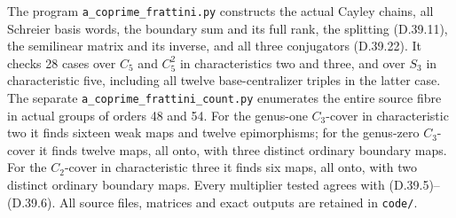 The program \texttt{a\_coprime\_frattini.py} constructs
the actual Cayley chains, all Schreier basis words,
the boundary sum and its full rank, the splitting
\textup{(D.39.11)}, the semilinear matrix and its
inverse, and all three conjugators
\textup{(D.39.22)}.
It checks 28 cases over \(C_5\) and \(C_5^2\)
in characteristics two and three, and over \(S_3\)
in characteristic five, including all twelve
base-centralizer triples in the latter case.
The separate
\texttt{a\_coprime\_frattini\_count.py}
enumerates the entire source fibre in actual
groups of orders 48 and 54.
For the genus-one \(C_3\)-cover in characteristic
two it finds sixteen weak maps and twelve
epimorphisms; for the genus-zero \(C_3\)-cover
it finds twelve maps, all onto, with three
distinct ordinary boundary maps.
For the \(C_2\)-cover in characteristic three
it finds six maps, all onto, with two distinct
ordinary boundary maps.
Every multiplier tested agrees with
\textup{(D.39.5)--(D.39.6)}.
All source files, matrices and exact outputs
are retained in \texttt{code/}.
